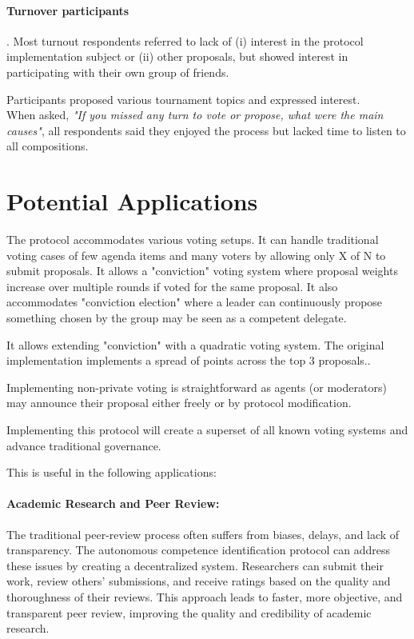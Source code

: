 \documentclass{article}
\begin{document}
\begin{CJK}{UTF8}{gbsn}
\begin{multicols}{2}
        \paragraph{Turnover participants}. Most turnout respondents referred to lack of (i) interest in the protocol implementation subject or (ii) other proposals, but showed interest in participating with their own group of friends.

        Participants proposed various tournament topics and expressed interest. \\When asked, \textit{"If you missed any turn to vote or propose, what were the main causes"}, all respondents said they enjoyed the process but lacked time to listen to all compositions.

        \section{Potential Applications}
        The protocol accommodates various voting setups. It can handle traditional voting cases of few agenda items and many voters by allowing only X of N to submit proposals.
        It allows a "conviction" voting system where proposal weights increase over multiple rounds if voted for the same proposal. It also accommodates "conviction election" where a leader can continuously propose something chosen by the group may be seen as a competent delegate.

        It allows extending "conviction" with a quadratic voting system. The original implementation implements a spread of points across the top 3 proposals.\cite{Buterin20}\cite{Benhaim2024}.

        Implementing non-private voting is straightforward as agents (or moderators) may announce their proposal either freely or by protocol modification.

        Implementing this protocol will create a superset of all known voting systems and advance traditional governance.

        This is useful in the following applications:

        \paragraph*{Academic Research and Peer Review:} The traditional peer-review process often suffers from biases, delays, and lack of transparency. The autonomous competence identification protocol can address these issues by creating a decentralized system. Researchers can submit their work, review others' submissions, and receive ratings based on the quality and thoroughness of their reviews. This approach leads to faster, more objective, and transparent peer review, improving the quality and credibility of academic research.


\end{multicols}
\end{CJK}
\end{document}
